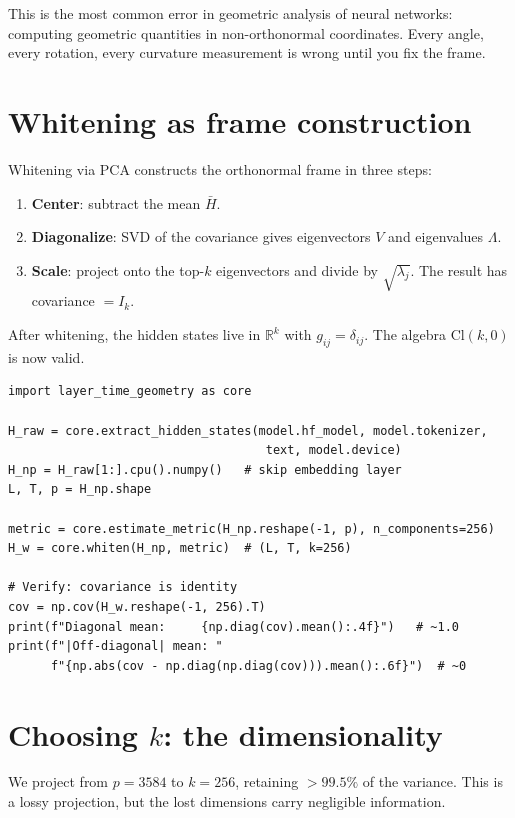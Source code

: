\documentclass[11pt, twoside, openright]{memoir}
\begin{document}
\begin{pitfall}
This is the most common error in geometric analysis of neural networks:
computing geometric quantities in non-orthonormal coordinates.  Every
angle, every rotation, every curvature measurement is wrong until you
fix the frame.
\end{pitfall}

\section{Whitening as frame construction}

Whitening via PCA constructs the orthonormal frame in three steps:
\begin{enumerate}[nosep]
\item \textbf{Center}: subtract the mean $\bar{H}$.
\item \textbf{Diagonalize}: SVD of the covariance gives eigenvectors
  $V$ and eigenvalues $\Lambda$.
\item \textbf{Scale}: project onto the top-$k$ eigenvectors and divide
  by $\sqrt{\lambda_j}$.  The result has covariance $= I_k$.
\end{enumerate}

After whitening, the hidden states live in $\mathbb{R}^k$ with
$g_{ij} = \delta_{ij}$.  The algebra $\mathrm{Cl}(k, 0)$ is now valid.

\begin{lstlisting}[caption={Whitening constructs the orthonormal frame}]
import layer_time_geometry as core

H_raw = core.extract_hidden_states(model.hf_model, model.tokenizer,
                                    text, model.device)
H_np = H_raw[1:].cpu().numpy()   # skip embedding layer
L, T, p = H_np.shape

metric = core.estimate_metric(H_np.reshape(-1, p), n_components=256)
H_w = core.whiten(H_np, metric)  # (L, T, k=256)

# Verify: covariance is identity
cov = np.cov(H_w.reshape(-1, 256).T)
print(f"Diagonal mean:     {np.diag(cov).mean():.4f}")   # ~1.0
print(f"|Off-diagonal| mean: "
      f"{np.abs(cov - np.diag(np.diag(cov))).mean():.6f}")  # ~0
\end{lstlisting}

\section{Choosing $k$: the dimensionality}

We project from $p = 3584$ to $k = 256$, retaining $>99.5\%$ of the
variance.  This is a lossy projection, but the lost dimensions carry
negligible information.
\end{document}
